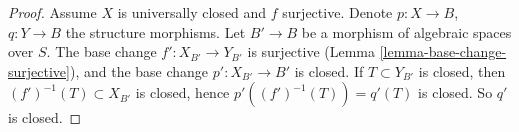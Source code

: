 \documentclass[10pt,a4paper]{amsart}
\theoremstyle{plain}
\theoremstyle{definition}
\theoremstyle{remark}
\numberwithin{equation}{subsection}
\begin{document}
\begin{proof}
Assume $X$ is universally closed and $f$ surjective.
Denote $p : X \to B$, $q : Y \to B$ the structure morphisms.
Let $B' \to B$ be a morphism of algebraic spaces over $S$.
The base change $f' : X_{B'} \to Y_{B'}$ is surjective
(Lemma \ref{lemma-base-change-surjective}), and the base
change $p' : X_{B'} \to B'$ is closed.
If $T \subset Y_{B'}$ is closed, then $(f')^{-1}(T) \subset X_{B'}$
is closed, hence $p'((f')^{-1}(T)) = q'(T)$ is closed.
So $q'$ is closed.
\end{proof}
\end{document}
